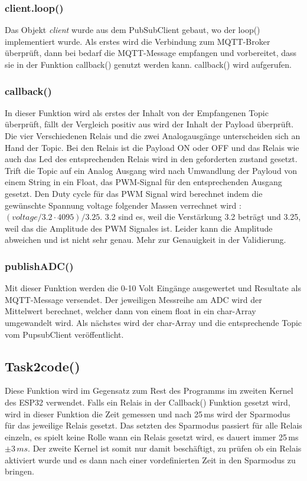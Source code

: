 \subsubsection{client.loop()}
 Das Objekt \textit{client} wurde aus dem PubSubClient gebaut, wo der loop() implementiert wurde. Als erstes wird die Verbindung zum MQTT-Broker überprüft, dann bei bedarf die MQTT-Message empfangen und vorbereitet, dass sie in der Funktion callback()  genutzt werden kann. callback() wird aufgerufen.
 \subsubsection{callback()}
 In dieser Funktion wird als erstes der Inhalt von der Empfangenen Topic überprüft, fällt der Vergleich positiv aus wird der Inhalt der Payload überprüft. Die vier Verschiedenen Relais und die zwei Analogausgänge unterscheiden sich an Hand der Topic. Bei den Relais ist die Payload ON oder OFF und das Relais wie auch das Led des entsprechenden Relais wird in den geforderten zustand gesetzt. Trift die Topic auf ein Analog Ausgang wird nach Umwandlung der Payloud von einem String in ein Float, das PWM-Signal für den entsprechenden Ausgang gesetzt. Den Duty cycle für das PWM Signal wird berechnet indem die gewünschte Spannung voltage folgender Massen verrechnet wird : $(voltage/3.2 \cdot 4095)/3.25$. 3.2 sind es, weil die Verstärkung 3.2 beträgt und 3.25, weil das die Amplitude des PWM Signales ist. Leider kann die Amplitude abweichen und ist nicht sehr genau. Mehr zur Genauigkeit in der Validierung.
 
 \subsubsection{publishADC()}
Mit dieser Funktion werden die 0-10 Volt Eingänge ausgewertet und Resultate als MQTT-Message versendet. Der jeweiligen Messreihe am ADC wird der Mittelwert berechnet, welcher dann von einem float in ein char-Array umgewandelt wird. Als nächstes wird der char-Array und die entsprechende Topic vom PupsubClient veröffentlicht.

\subsection{Task2code()}
Diese Funktion wird im Gegensatz zum Rest des Programms im zweiten Kernel des ESP32 verwendet. Falls ein Relais in der Callback() Funktion gesetzt wird, wird in dieser Funktion die Zeit gemessen und nach 25\,ms wird der Sparmodus für das jeweilige Relais gesetzt. Das setzten des Sparmodus passiert für alle Relais einzeln, es spielt keine Rolle wann ein Relais gesetzt wird, es dauert immer 25\,ms $\pm 3 \,ms$. Der zweite Kernel ist somit nur damit beschäftigt, zu prüfen ob ein Relais aktiviert wurde und es dann nach einer vordefinierten Zeit in den Sparmodus zu bringen.
\newpage

